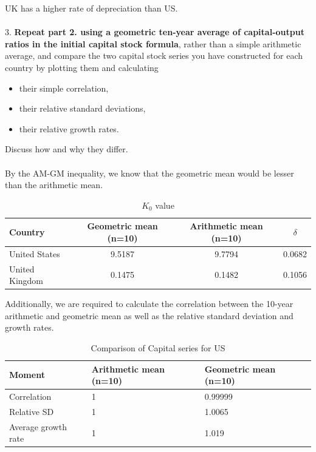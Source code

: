 \documentclass[11pt]{article}
\theoremstyle{mytheoremstyle}
\theoremstyle{mytheoremstyle}
\theoremstyle{myproblemstyle}
\begin{document}
UK has a higher rate of depreciation than US.
\\ \\ 
3. \textbf{Repeat part 2. using a geometric ten-year average of capital-output ratios in the initial capital stock formula}, rather than a simple arithmetic average, and compare the two capital stock series you have constructed for each country by plotting them and calculating
\begin{itemize}
    \item their simple correlation,
    \item their relative standard deviations,
    \item their relative growth rates.
\end{itemize}

Discuss how and why they differ.
\\ \\
By the AM-GM inequality, we know that the geometric mean would be lesser than the arithmetic mean.

\begin{table}[h]
    \centering
    \caption{$K_0$ value }
    \label{tab:table-1}
    \begin{tabular}{@{}lccc@{}}
    \toprule
    Country & Geometric mean (n=10) & Arithmetic mean (n=10) & $\delta$ \\ \midrule
    United States & 9.5187 & 9.7794 & 0.0682 \\
    United Kingdom & 0.1475 & 0.1482 & 0.1056 \\ \bottomrule
    \end{tabular}
    \end{table}

Additionally, we are required to calculate the correlation between the 10-year arithmetic and geometric mean as well as the relative standard deviation and growth rates. 

\begin{table}[h]
    \centering
    \caption{Comparison of Capital series for US}
    \label{tab:US_K}
    \begin{tabular}{@{}lll@{}}
    \toprule
    Moment & Arithmetic mean (n=10) & Geometric mean (n=10) \\ \midrule
    Correlation & 1 & 0.99999 \\
    Relative SD & 1 & 1.0065 \\
    Average growth rate & 1 & 1.019 \\ \bottomrule
    \end{tabular}
    \end{table}
\end{document}
